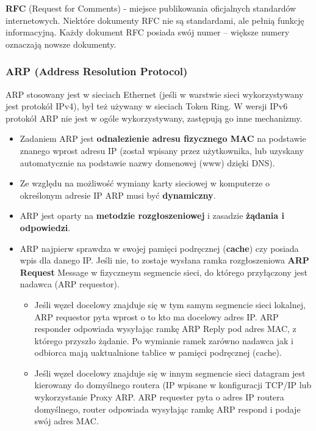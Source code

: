 \documentclass[../main.tex]{subfiles}
\begin{document}
    \textbf{RFC} (Request for Comments) - miejsce publikowania oficjalnych standardów internetowych. Niektóre dokumenty RFC nie są standardami, ale pełnią funkcję informacyjną. Każdy dokument RFC posiada swój numer – większe numery oznaczają nowsze dokumenty.

    \subsubsection{ARP (Address Resolution Protocol)}
    ARP stosowany jest w sieciach Ethernet (jeśli w warstwie sieci wykorzystywany jest protokół
    IPv4), był też używany w sieciach Token Ring. W wersji IPv6 protokół ARP nie jest w ogóle wykorzystywany, zastępują go inne mechanizmy.\\

    \begin{itemize}
        \item  Zadaniem ARP jest \textbf{odnalezienie adresu fizycznego MAC} na podstawie znanego wprost adresu IP (został wpisany przez użytkownika, lub uzyskany automatycznie na podstawie nazwy domenowej (www) dzięki DNS).
        \item Ze względu na możliwość wymiany karty sieciowej w komputerze o określonym adresie IP ARP musi być \textbf{dynamiczny}.
        \item ARP jest oparty na \textbf{metodzie rozgłoszeniowej} i zasadzie \textbf{żądania i odpowiedzi}.
        \item ARP najpierw sprawdza w swojej pamięci podręcznej (\textbf{cache}) czy posiada wpis dla danego IP. Jeśli nie, to zostaje wysłana ramka rozgłoszeniowa \textbf{ARP Request} Message w fizyczneym segmencie sieci, do którego przyłączony jest nadawca (ARP requestor).
        \begin{itemize}
            \item Jeśli węzeł docelowy znajduje się w tym samym segmencie sieci lokalnej, ARP requestor pyta wprost o to kto ma docelowy adres IP. ARP responder odpowiada wysyłając ramkę ARP Reply pod adres MAC, z którego przyszło żądanie. Po wymianie ramek zarówno nadawca jak i odbiorca mają uaktualnione tablice w pamięci podręcznej (cache).
            \item Jeśli węzeł docelowy znajduje się w innym segmencie sieci datagram jest kierowany do domyślnego routera (IP wpisane w konfiguracji TCP/IP lub wykorzystanie Proxy ARP. ARP requester pyta o adres IP routera domyślnego, router odpowiada wysyłając ramkę ARP respond i podaje swój adres MAC.
        \end{itemize}

\end{itemize}
\end{document}
